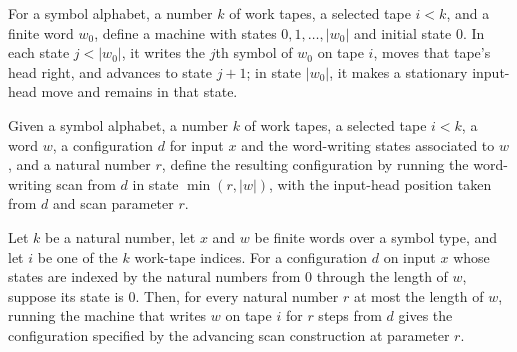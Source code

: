 \begin{definition}
\label{Turing.writeAdvTM}
\leanok
{}
For a symbol alphabet, a number $k$ of work tapes, a selected tape $i<k$, and a finite
word $w_0$, define a machine with states $0,1,\ldots,|w_0|$ and initial state $0$. In
each state $j<|w_0|$, it writes the $j$th symbol of $w_0$ on tape $i$, moves that tape's
head right, and advances to state $j+1$; in state $|w_0|$, it makes a stationary
input-head move and remains in that state.
\end{definition}

\begin{definition}
\label{Turing.scanAdvF}
\leanok
{}
Given a symbol alphabet, a number $k$ of work tapes, a selected tape $i<k$, a word $w$,
a configuration $d$ for input $x$ and the word-writing states associated to $w$, and a
natural number $r$, define the resulting configuration by running the word-writing scan
from $d$ in state $\min(r,|w|)$, with the input-head position taken from $d$ and scan
parameter $r$.
\end{definition}

\begin{theorem}
\label{Turing.scan_adv_run}
\leanok
{}
Let $k$ be a natural number, let $x$ and $w$ be finite words over a symbol type, and let
$i$ be one of the $k$ work-tape indices. For a configuration $d$ on input $x$ whose
states are indexed by the natural numbers from $0$ through the length of $w$, suppose
its state is $0$. Then, for every natural number $r$ at most the length of $w$, running
the machine that writes $w$ on tape $i$ for $r$ steps from $d$ gives the configuration
specified by the advancing scan construction at parameter $r$.
\end{theorem}

